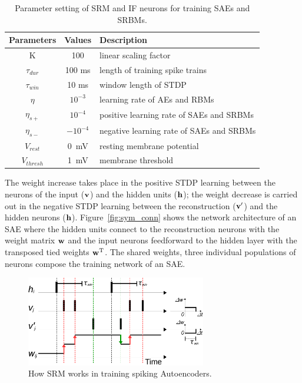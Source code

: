 \begin{table}[th]
	\centering
	\caption{\label{tbl:srm}Parameter setting of SRM and IF neurons for training SAEs and SRBMs.}
	\bgroup
	\def\arraystretch{1.2}
	\begin{tabular}{c c l}
		Parameters & Values & Description \\
		\hline
		K & 100 & linear scaling factor\\
		$\tau_{dur}$ & 100 ms &  length of training spike trains\\
		$\tau_{win}$ & 10 ms & window length of STDP\\
		$\eta$ & $10^{-3}$ & learning rate of AEs and RBMs\\
		$\eta_{s+}$ & $10^{-4}$ & positive learning rate of SAEs and SRBMs\\
		$\eta_{s-}$ & $-10^{-4}$ & negative learning rate of SAEs and SRBMs\\
		$V_{rest}$ & 0~mV & resting membrane potential\\
		$V_{thresh}$ & 1~mV & membrane threshold  \\
	\end{tabular}
	\egroup
\end{table}


The weight increase takes place in the positive STDP learning between the neurons of the input ($\bf{v}$) and the hidden units ($\bf{h}$); 
the weight decrease is carried out in the negative STDP learning between the reconstruction ($\bf{v'}$) and the hidden neurons ($\bf{h}$).
Figure~\ref{fig:sym_conn} shows the network architecture of an SAE where the hidden units connect to the reconstruction neurons with the weight matrix $\bf{w}$ and the input neurons feedforward to the hidden layer with the transposed tied weights $\bf{w}^\textrm{T}$.
The shared weights, three individual populations of neurons compose the training network of an SAE.

\begin{figure}[th]
	\centering
	\includegraphics[width=0.7\textwidth]{pics_sdlm/rSTDP.pdf}
	\caption{How SRM works in training spiking Autoencoders.}
	\label{fig:rSTDP}
\end{figure}

